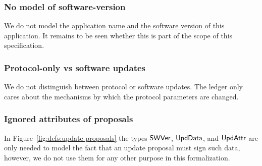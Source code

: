 \subsubsection{No model of software-version}
\label{sec:no-model-software-version}

We do not model the
\href{https://github.com/input-output-hk/cardano-sl/blob/develop/docs/block-processing/us.md#software-version}{application
  name and the software version} of this application. It remains to be seen
whether this is part of the scope of this specification.


\subsubsection{Protocol-only vs software updates}
\label{sec:protocol-vs-software-updates}

We do not distinguish between protocol or software updates. The ledger only
cares about the mechanisms by which the protocol parameters are changed.

\subsubsection{Ignored attributes of proposals}

In Figure~\ref{fig:defs:update-proposals} the types $\mathsf{SWVer}$,
$\mathsf{UpdData}$, and $\mathsf{UpdAttr}$ are only needed to model the fact that
an update proposal must sign such data, however, we do not use them for any
other purpose in this formalization.
